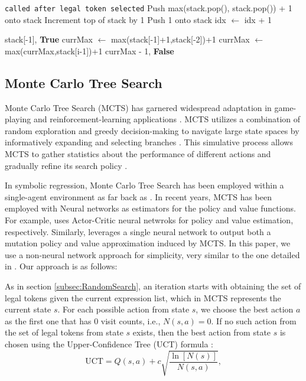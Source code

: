 \documentclass[12pt]{iopart}
\begin{document}
\begin{algorithm}
\begin{algorithmic}[1]
        \EndIf

    \Else \Comment\texttt{{called after legal token selected}}
            \State Push max(stack.pop(), stack.pop()) + 1 onto stack 
            \State Increment top of stack by 1 
        \Else 
            \State Push 1 onto stack
         \EndIf 
         \State idx $\gets$ idx + 1

             \State \Return stack[-1], \textbf{True}
        \Else
            \State currMax $\gets$ max(stack[-1]+1,stack[-2])+1
                \State currMax $\gets$ max(currMax,stack[i-1])+1
            \EndFor
            \State \Return currMax - 1, \textbf{False}
        \EndIf

    \EndIf
\EndFunction
\end{algorithmic}
\end{algorithm}

\subsection{Monte Carlo Tree Search}\label{subsec:MonteCarlo TreeSearch}

Monte Carlo Tree Search (MCTS) has garnered widespread adaptation in game-playing and reinforcement-learning applications \cite{Silver2016} \cite{Swiechowski2023}. MCTS utilizes a combination of random exploration and greedy decision-making to navigate large state spaces by informatively expanding and selecting branches \cite{Swiechowski2023}. This simulative process allows MCTS to gather statistics about the performance of different actions and gradually refine its search policy \cite{Swiechowski2023}.

In symbolic regression, Monte Carlo Tree Search has been employed within a single-agent environment as far back as \cite{CazenaveMCTS}. In recent years, MCTS has been employed with Neural networks as estimators for the policy and value functions. For example, \cite{Lu2021} uses Actor-Critic neural netwroks for policy and value estimation, respectively. Similarly,  \cite{10.5555/3618408.3619047} leverages a single neural network to output both a mutation policy and value approximation induced by MCTS. In this paper, we use a non-neural network approach for simplicity, very similar to the one detailed in \cite{sun2023symbolic}.  Our approach is as follows:
\par As in section \ref{subsec:RandomSearch}, an iteration starts with obtaining the set of legal tokens given the current expression list, which in MCTS represents the current state $s$. For each possible action from state $s$, we choose the best action $a$ as the first one that has 0 visit counts, i.e., $N(s,a) = 0$. If no such action from the set of legal tokens from state $s$ exists, then the best action from state $s$ is chosen using the Upper-Confidence Tree (UCT) formula \cite{sun2023symbolic}:
\begin{equation}
\mathrm{UCT} = Q(s,a) + c\sqrt{\frac{\ln{[N(s)]}}{N(s,a)}}, \label{eq:UCT_formula}
\end{equation}
\end{document}
